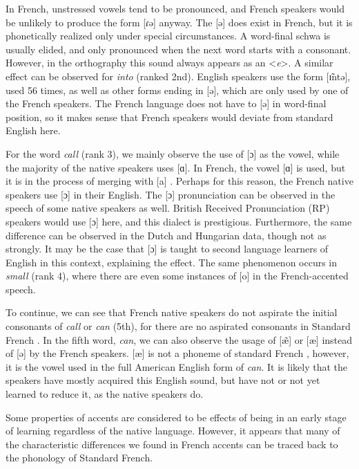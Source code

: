 \documentclass[output=paper]{LSP/langsci}
\begin{document}
In French, unstressed vowels tend to be pronounced, and French speakers would be unlikely to produce the form [ɾə] anyway. The [ə] does exist in French, but it is phonetically realized only under special circumstances. A word-final schwa is usually elided, and only pronounced when the next word starts with a consonant. However, in the orthography this sound always appears as an <\textit{e}>. A similar effect can be observed for \textit{into} (ranked 2nd). English speakers use the form [ɪ̃ntə], used 56 times, as well as other forms ending in [ə], which are only used by one of the French speakers. The French language does not have  to [ə] in word-final position, so it makes sense that French speakers would deviate from standard English here.

\largerpage[-1]
For the word \textit{call} (rank 3), we mainly observe the use of [ɔ] as the vowel, while the majority of the native speakers uses [ɑ]. In French, the vowel [ɑ] is used, but it is in the process of merging with [a] \citep[60--62]{walker_french_2001}. Perhaps for this reason, the French native speakers use [ɔ] in their English. The [ɔ] pronunciation can be observed in the speech of some native speakers as well. British Received Pronunciation (RP) speakers would use [ɔ] here, and this dialect is prestigious. Furthermore, the same difference can be observed in the Dutch and Hungarian data, though not as strongly. It may be the case that [ɔ] is taught to second language learners of English in this context, explaining the effect. The same phenomenon occurs in \textit{small} (rank 4), where there are even some instances of [o] in the French-accented speech.

To continue, we can see that French native speakers do not aspirate the initial consonants of \textit{call} or \textit{can} (5th), for there are no aspirated consonants in Standard French \citep[p. 35]{walker_pronunciation_1984}. In the fifth word, \textit{can}, we can also observe the usage of [æ̃] or [æ] instead of [ə] by the French speakers. [æ] is not a phoneme of standard French \citep{walker_french_2001}, however, it is the vowel used in the full American English form of \textit{can}. It is likely that the speakers have mostly acquired this English sound, but have not or not yet learned to reduce it, as the native speakers do.

Some properties of accents are considered to be effects of being in an early stage of learning regardless of the native language. However, it appears that many of the characteristic differences we found in French accents can be traced back to the phonology of Standard French.
\end{document}
